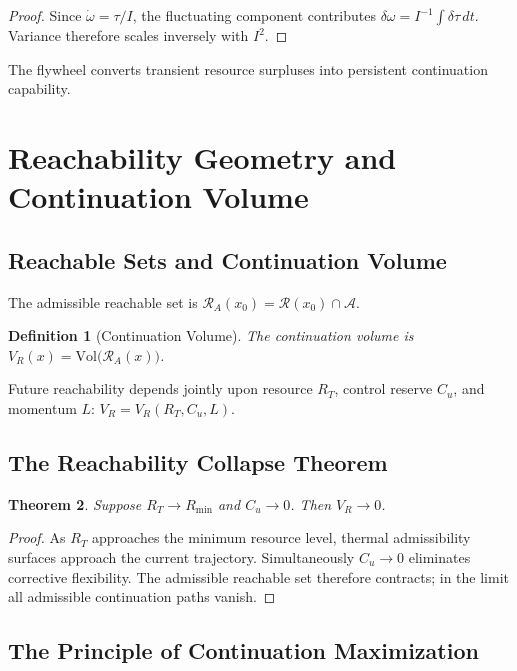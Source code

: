 \documentclass[12pt,a4paper]{article}
\newtheorem{theorem}{Theorem}[section]
\newtheorem{definition}[theorem]{Definition}
\newcommand{\A}{\mathcal{A}}
\begin{document}
\begin{proof}
Since $\dot\omega = \tau/I$, the fluctuating component contributes $\delta\omega = I^{-1}\int \delta\tau\, dt$. Variance therefore scales inversely with $I^2$.
\end{proof}

The flywheel converts transient resource surpluses into persistent continuation capability.

\section{Reachability Geometry and Continuation Volume}

\subsection{Reachable Sets and Continuation Volume}

The admissible reachable set is $\mathcal{R}_A(x_0) = \mathcal{R}(x_0) \cap \A$.

\begin{definition}[Continuation Volume]
The \emph{continuation volume} is $V_R(x) = \mathrm{Vol}\bigl(\mathcal{R}_A(x)\bigr)$.
\end{definition}

Future reachability depends jointly upon resource $R_T$, control reserve $C_u$, and momentum $L$:
$V_R = V_R(R_T, C_u, L)$.

\subsection{The Reachability Collapse Theorem}

\begin{theorem}
Suppose $R_T \to R_{\min}$ and $C_u \to 0$. Then $V_R \to 0$.
\end{theorem}

\begin{proof}
As $R_T$ approaches the minimum resource level, thermal admissibility surfaces approach the current trajectory. Simultaneously $C_u \to 0$ eliminates corrective flexibility. The admissible reachable set therefore contracts; in the limit all admissible continuation paths vanish.
\end{proof}

\subsection{The Principle of Continuation Maximization}
\end{document}
